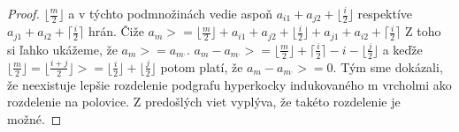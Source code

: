 \begin{proof}
$\lfloor \frac{m}{2} \rfloor$ a v týchto podmnožinách vedie aspoň $a_{i1} +
a_{j2} + \lfloor \frac{i}{2} \rfloor $ respektíve $a_{j1} + a_{i2} + 
\lceil \frac{i}{2} \rceil$ hrán.
Čiže $a_{m} >= \lfloor \frac{m}{2} \rfloor + a_{i1} +
a_{j2} + \lfloor \frac{i}{2} \rfloor + a_{j1} + a_{i2} + 
\lceil \frac{i}{2} \rceil$
Z toho si ľahko ukážeme, že $a_{m} >= a_{m^{,}}$.
 $a_{m} - a_{m^{,}} >= \lfloor \frac{m}{2}\rfloor + \lceil \frac{i}{2}
\rceil - i - \lfloor \frac{j}{2} \rfloor$ a keďže 
$\lfloor \frac{m}{2}\rfloor = \lfloor \frac{i+j}{2}\rfloor >= \lfloor \frac{i}{2} \rfloor + \lfloor \frac{j}{2} \rfloor$
potom platí, že $a_{m} - a_{m^{,}} >=0$. Tým sme dokázali, že neexistuje
lepšie rozdelenie podgrafu hyperkocky indukovaného m vrcholmi ako rozdelenie
na polovice. Z predošlých viet vyplýva, že takéto rozdelenie je možné.
\end{proof}




